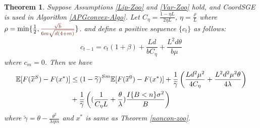 \documentclass{article}
\newcommand*{\E}{\mathbb{E}}
\newtheorem{theorem}{Theorem}[section]
\theoremstyle{definition}
\theoremstyle{remark}
\begin{document}
\begin{theorem}\label{SC-theo}
Suppose   Assumptions \ref{Lip-Zoo} and \ref{Var-Zoo}  hold, and  CoordSGE  is  used  in  Algorithm \ref{APGconvex-Algo}. Let  $C_{\eta} = \frac{1-\eta L}{2\eta L}$, $\eta = \frac{\rho}{L}$ where $\rho = \min\{\frac{1}{2},{\color{Brown}\frac{\sqrt{b}}{6m\sqrt{d(4+m)}}}\}$. and define a positive sequence $\{c_t\}$ as follows:
\[
c_{t-1} = c_{t}(1+{\beta})+\frac{Ld}{bC_{\eta}}+\frac{L^2d\theta}{b\mu}
\]
where $c_m = 0$. Then we have
\begin{align}\label{main-eq-SC}
\E[F(\widetilde{x}^S) - F(x^*)] & \leq {(1-\widetilde{\gamma})}^{Sm} \E[F(\widetilde{x}^0) - F(x^*)]+\frac{1}{{\widetilde{\gamma}}}\left(\frac{Ld^2\mu^2}{4C_{\eta}}+\frac{ L^2d^2\mu^2\theta}{4\lambda}\right)\notag\\
&+ \frac{1}{\widetilde{\gamma}}\left((\frac{1}{C_{\eta} L}+\frac{\theta}{\lambda})\frac{I\{B < n\} \sigma ^2}{B}\right)
\end{align}
where $\widetilde{\gamma}  = \theta - \frac{ \theta^2}{\lambda\eta m}$ and $x^*$ is same as Theorem \ref{noncon-zoo}.

\end{theorem}
\end{document}
